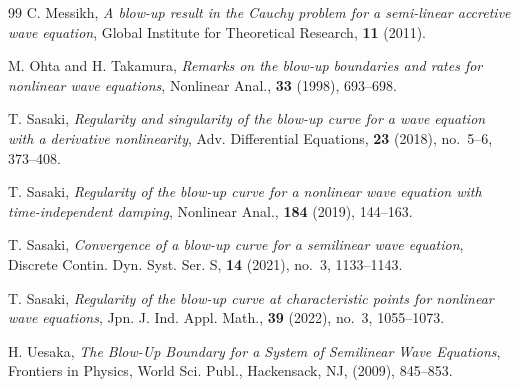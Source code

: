 \documentclass[
  sn-mathphys-num,
  colorlinks,
  linkcolor=darkmagenta,
  citecolor=rufous,
  urlcolor=zaffre,
  hypertexnames=false
]{sn-jnl}
\numberwithin{equation}{section}
\begin{document}
\begin{thebibliography}{99}
C. Messikh, \textit{A blow-up result in the Cauchy problem for a semi-linear accretive wave equation}, Global Institute for Theoretical Research, \textbf{11} (2011).

M. Ohta and H. Takamura, \textit{Remarks on the blow-up boundaries and rates for nonlinear wave equations}, Nonlinear Anal., \textbf{33} (1998), 693–698.

T. Sasaki, \textit{Regularity and singularity of the blow-up curve for a wave equation with a derivative nonlinearity}, Adv. Differential Equations, \textbf{23} (2018), no.~5--6, 373--408.

T. Sasaki, \textit{Regularity of the blow-up curve for a nonlinear wave equation with time-independent damping}, Nonlinear Anal., \textbf{184} (2019), 144–163.

T. Sasaki, \textit{Convergence of a blow-up curve for a semilinear wave equation}, Discrete Contin. Dyn. Syst. Ser. S, \textbf{14} (2021), no.~3, 1133–1143.

T. Sasaki, \textit{Regularity of the blow-up curve at characteristic points for nonlinear wave equations}, Jpn. J. Ind. Appl. Math., \textbf{39} (2022), no.~3, 1055–1073.

H. Uesaka, \textit{The Blow-Up Boundary for a System of Semilinear Wave Equations}, Frontiers in Physics, World Sci. Publ., Hackensack, NJ, (2009), 845–853.

\end{thebibliography}
\end{document}
